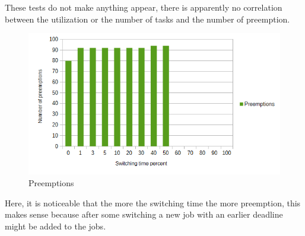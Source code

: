 \documentclass[a4paper,12pt]{article}
\begin{document}
These tests do not make anything appear, there is apparently no correlation between the utilization or the number of tasks and the number of preemption.

\begin{figure}[H]
	\begin{center}
		\includegraphics[scale=1]{switchingpreemption.png}
	\end{center}
	\label{p}
	\caption{Preemptions}
\end{figure}

Here, it is noticeable that the more the switching time the more preemption, this makes sense because after some switching a new job with an earlier deadline might be added to the jobs.
\end{document}

